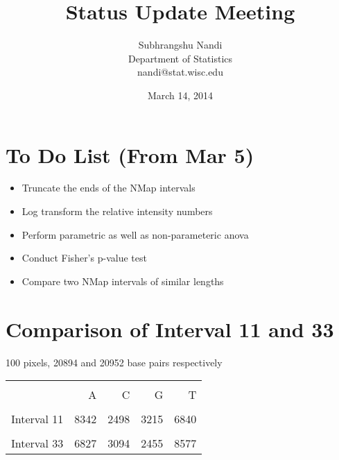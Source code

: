 \documentclass[14pt]{article}
\begin{document}

\title{Status Update Meeting}
\author{Subhrangshu Nandi\\
  Department of Statistics\\
  nandi@stat.wisc.edu}
\date{March 14, 2014}
\maketitle

\section*{To Do List (From Mar 5)}
\begin{itemize}
\item
{\Large Truncate the ends of the NMap intervals}
\item
{\Large Log transform the relative intensity numbers}
\item
{\Large Perform parametric as well as non-parameteric anova}
\item
{\Large Conduct Fisher's p-value test}
\item
{\Large Compare two NMap intervals of similar lengths}
\end{itemize}

\section*{Comparison of Interval 11 and 33}
{\Large 100 pixels, 20894 and 20952 base pairs respectively}

\begin{table}[ht]
\centering
\begin{tabular}{rrrrr}
  \hline \\
 & A & C & G & T \\[0.25cm] 
  \hline \hline \\
Interval 11 & 8342 & 2498 & 3215 & 6840 \\[0.25cm]
   \hline \\
Interval 33 & 6827 & 3094 & 2455 & 8577 \\[0.25cm]
\hline \hline
\end{tabular}
\end{table}
\end{document}

